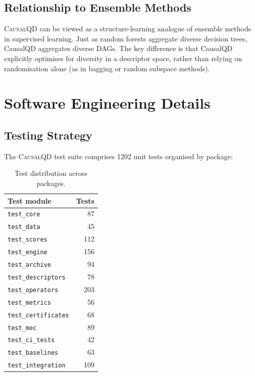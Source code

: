 \documentclass[11pt,a4paper]{article}
\begin{document}
\subsection{Relationship to Ensemble Methods}

\textsc{CausalQD} can be viewed as a structure-learning analogue of ensemble methods in supervised learning. Just as random forests aggregate diverse decision trees, CausalQD aggregates diverse DAGs. The key difference is that CausalQD explicitly optimises for diversity in a descriptor space, rather than relying on randomisation alone (as in bagging or random subspace methods).

\section{Software Engineering Details}
\label{app:software}

\subsection{Testing Strategy}

The \textsc{CausalQD} test suite comprises 1202 unit tests organised by package:

\begin{table}[h]
\centering
\caption{Test distribution across packages.}
\label{tab:tests}
\begin{tabular}{@{}lr@{}}
\toprule
\textbf{Test module} & \textbf{Tests} \\
\midrule
\texttt{test\_core} & 87 \\
\texttt{test\_data} & 45 \\
\texttt{test\_scores} & 112 \\
\texttt{test\_engine} & 156 \\
\texttt{test\_archive} & 94 \\
\texttt{test\_descriptors} & 78 \\
\texttt{test\_operators} & 203 \\
\texttt{test\_metrics} & 56 \\
\texttt{test\_certificates} & 68 \\
\texttt{test\_mec} & 89 \\
\texttt{test\_ci\_tests} & 42 \\
\texttt{test\_baselines} & 63 \\
\texttt{test\_integration} & 109 \\
\bottomrule
\end{tabular}
\end{table}
\end{document}
